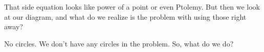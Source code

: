 


That side equation looks like power of a point or even Ptolemy. But then we look at our diagram, and what do we realize is the problem with using those right away?










No circles. We don't have any circles in the problem. So, what do we do?









